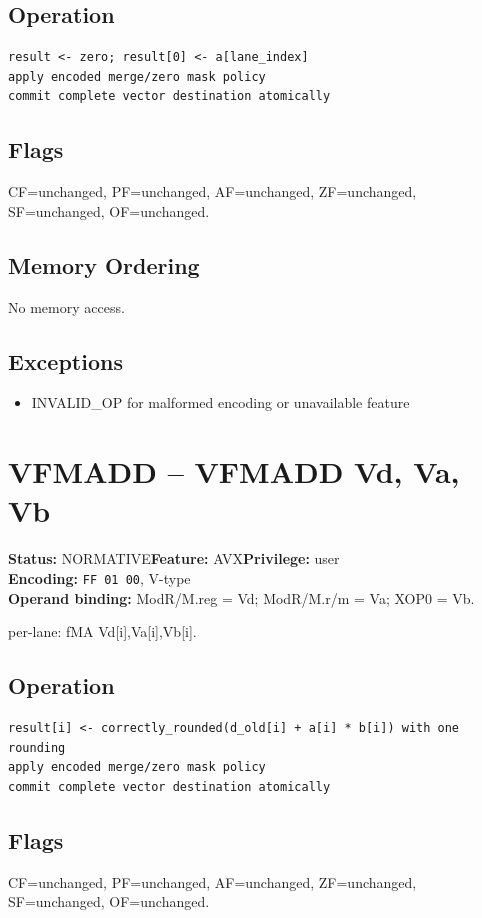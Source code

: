 \documentclass[10pt]{article}
\begin{document}
\subsection*{Operation}
\begin{lstlisting}
result <- zero; result[0] <- a[lane_index]
apply encoded merge/zero mask policy
commit complete vector destination atomically
\end{lstlisting}
\subsection*{Flags}
CF=unchanged, PF=unchanged, AF=unchanged, ZF=unchanged, SF=unchanged, OF=unchanged.
\subsection*{Memory Ordering}
No memory access.
\subsection*{Exceptions}
\begin{itemize}
\item INVALID\_OP for malformed encoding or unavailable feature
\end{itemize}
\clearpage

\section{VFMADD -- VFMADD Vd, Va, Vb}
\textbf{Status:} NORMATIVE\quad \textbf{Feature:} AVX\quad \textbf{Privilege:} user\\
\textbf{Encoding:} \texttt{FF 01 00}, V-type\\
\textbf{Operand binding:} ModR/M.reg = Vd; ModR/M.r/m = Va; XOP0 = Vb.

per-lane: fMA Vd[i],Va[i],Vb[i].

\subsection*{Operation}
\begin{lstlisting}
result[i] <- correctly_rounded(d_old[i] + a[i] * b[i]) with one rounding
apply encoded merge/zero mask policy
commit complete vector destination atomically
\end{lstlisting}
\subsection*{Flags}
CF=unchanged, PF=unchanged, AF=unchanged, ZF=unchanged, SF=unchanged, OF=unchanged.
\end{document}

